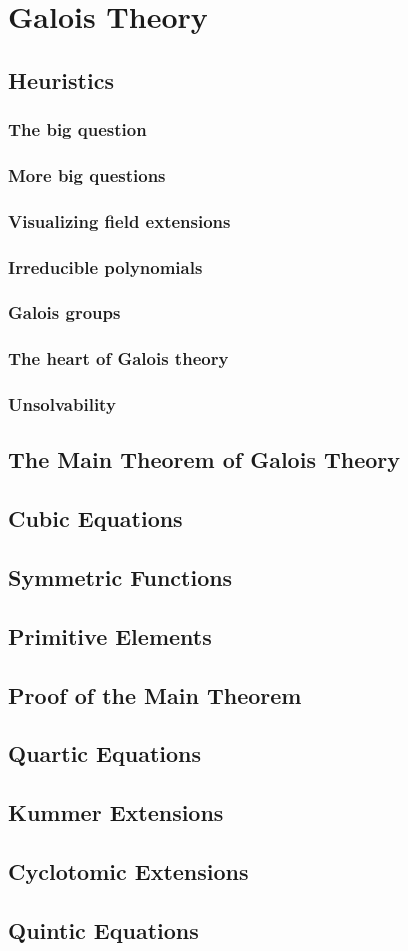 \chapter{Galois Theory}
\section{Heuristics}
\subsection{The big question}
\subsection{More big questions}
\subsection{Visualizing field extensions}
\subsection{Irreducible polynomials}
\subsection{Galois groups}
\subsection{The heart of Galois theory}
\subsection{Unsolvability}
\section{The Main Theorem of Galois Theory}
\section{Cubic Equations}
\section{Symmetric Functions}
\section{Primitive Elements}
\section{Proof of the Main Theorem}
\section{Quartic Equations}
\section{Kummer Extensions}
\section{Cyclotomic Extensions}
\section{Quintic Equations}
